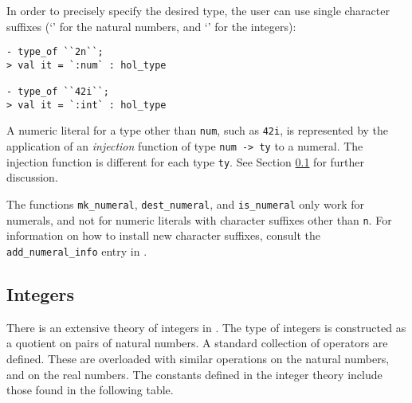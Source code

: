  In order to precisely specify the desired type, the user can use single
character suffixes (`' for the natural numbers, and `' for
the integers):
\begin{session}
{\small
\begin{verbatim}
- type_of ``2n``;
> val it = `:num` : hol_type

- type_of ``42i``;
> val it = `:int` : hol_type
\end{verbatim}}
\end{session}

A numeric literal for a \HOL{} type other than \verb+num+, such as
\verb+42i+,  is represented by the application of an
\emph{injection} function of type {\small\verb+num -> ty+} to a
numeral. The injection function is different for each type
{\small\verb+ty+}. See Section \ref{integers} for further discussion.

The functions {\verb+mk_numeral+}, {\verb+dest_numeral+}, and
{\verb+is_numeral+} only work for numerals, and not for numeric
literals with character suffixes other than {\small\verb+n+}. For
information on how to install new character suffixes, consult the
{\small\verb+add_numeral_info+} entry in \REFERENCE.

\subsection{Integers}\label{integers}

There is an extensive theory of integers in \HOL. The type of integers
is constructed as a quotient on pairs of natural numbers. A standard
collection of operators are defined. These are overloaded with
similar operations on the natural numbers, and on the real numbers.
The constants defined in the integer theory include those found in the
following table.


